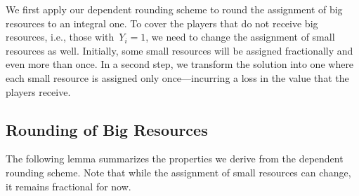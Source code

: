 We first apply our dependent rounding scheme to round
the assignment of big resources to an integral one.
To cover the players that do not receive big resources, i.e.,
those with~$Y_i = 1$, we need to change the assignment of
small resources as well.
Initially, some small resources will be assigned fractionally
and even more than once.
In a second step, we transform the solution into one
where each small resource is assigned only once---incurring a
loss in the value that the players receive.

\subsection{Rounding of Big Resources}
\label{sec:rounding-of-big-items}
The following lemma summarizes the properties we derive
from the dependent rounding scheme. 
Note that while the assignment of small resources can change, it remains fractional for now.

